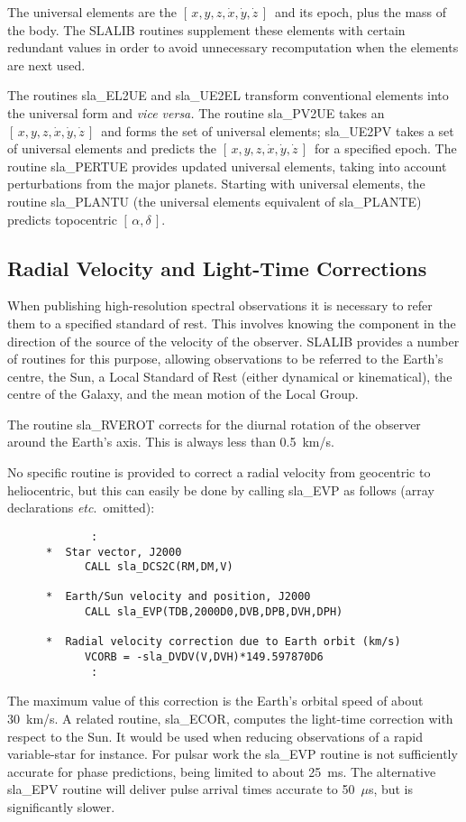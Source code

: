 \documentclass[11pt,twoside]{article}
\newcommand{\radec}     {$[\,\alpha,\delta\,]$}
\newcommand{\xyzxyzd}   {$[\,x,y,z,\dot{x},\dot{y},\dot{z}\,]$}
\begin{document}
The universal elements are the \xyzxyzd\ and its epoch, plus the mass
of the body.  The SLALIB routines supplement these elements with
certain redundant values in order to
avoid unnecessary recomputation when the elements are next used.

The routines
sla\_EL2UE and
sla\_UE2EL transform conventional elements into the
universal form and {\it vice versa.}
The routine
sla\_PV2UE takes an \xyzxyzd\ and forms the set of universal
elements;
sla\_UE2PV takes a set of universal elements and predicts the \xyzxyzd\
for a specified epoch.
The routine
sla\_PERTUE provides updated universal elements,
taking into account perturbations from the major planets.
Starting with universal elements, the routine
sla\_PLANTU (the universal elements equivalent of
sla\_PLANTE) predicts topocentric \radec.

\subsection{Radial Velocity and Light-Time Corrections}
When publishing high-resolution spectral observations
it is necessary to refer them to a specified standard of rest.
This involves knowing the component in the direction of the
source of the velocity of the observer.  SLALIB provides a number
of routines for this purpose, allowing observations to be
referred to the Earth's centre, the Sun, a Local Standard of Rest
(either dynamical or kinematical), the centre of the Galaxy, and
the mean motion of the Local Group.

The routine
sla\_RVEROT
corrects for the diurnal rotation of
the observer around the Earth's axis.  This is always less than 0.5~km/s.

No specific routine is provided to correct a radial velocity
from geocentric to heliocentric, but this can easily be done by calling
sla\_EVP
as follows (array declarations {\it etc}.\ omitted):
\goodbreak
\begin{verbatim}
             :
      *  Star vector, J2000
            CALL sla_DCS2C(RM,DM,V)

      *  Earth/Sun velocity and position, J2000
            CALL sla_EVP(TDB,2000D0,DVB,DPB,DVH,DPH)

      *  Radial velocity correction due to Earth orbit (km/s)
            VCORB = -sla_DVDV(V,DVH)*149.597870D6
             :
\end{verbatim}
\goodbreak
The maximum value of this correction is the Earth's orbital speed
of about 30~km/s.  A related routine,
sla\_ECOR,
computes the light-time correction with respect to the Sun.  It
would be used when reducing observations of a rapid variable-star
for instance.
For pulsar work the
sla\_EVP routine is not sufficiently accurate for
phase predictions, being limited to about 25~ms.  The
alternative sla\_EPV routine will deliver pulse arrival times
accurate to 50~$\mu$s, but is significantly slower.
\end{document}
